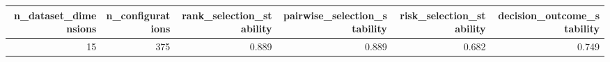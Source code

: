 \begin{tabular}{rrrrrr}
\toprule
n\_dataset\_dimensions & n\_configurations & rank\_selection\_stability & pairwise\_selection\_stability & risk\_selection\_stability & decision\_outcome\_stability \\
\midrule
15 & 375 & 0.889 & 0.889 & 0.682 & 0.749 \\
\bottomrule
\end{tabular}
